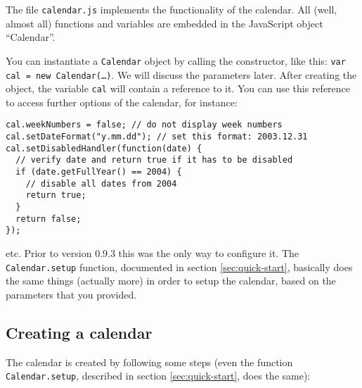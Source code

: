 \documentclass[a4paper,10pt]{article}
\begin{document}
The file \texttt{calendar.js} implements the functionality of the calendar.
All (well, almost all) functions and variables are embedded in the JavaScript
object ``Calendar''.

You can instantiate a \texttt{Calendar} object by calling the constructor, like
this: \texttt{var cal = new Calendar(\ldots)}.  We will discuss the parameters
later.  After creating the object, the variable \texttt{cal} will contain a
reference to it.  You can use this reference to access further options of the
calendar, for instance:

\begin{verbatim}
cal.weekNumbers = false; // do not display week numbers
cal.setDateFormat("y.mm.dd"); // set this format: 2003.12.31
cal.setDisabledHandler(function(date) {
  // verify date and return true if it has to be disabled
  if (date.getFullYear() == 2004) {
    // disable all dates from 2004
    return true;
  }
  return false;
});
\end{verbatim}

\noindent etc.  Prior to version
0.9.3 this was the only way to configure it.  The \texttt{Calendar.setup}
function, documented in section \ref{sec:quick-start}, basically does the same
things (actually more) in order to setup the calendar, based on the parameters
that you provided.

\subsection{Creating a calendar}

The calendar is created by following some steps (even the function
\texttt{Calendar.setup}, described in section \ref{sec:quick-start}, does the
same):
\end{document}
